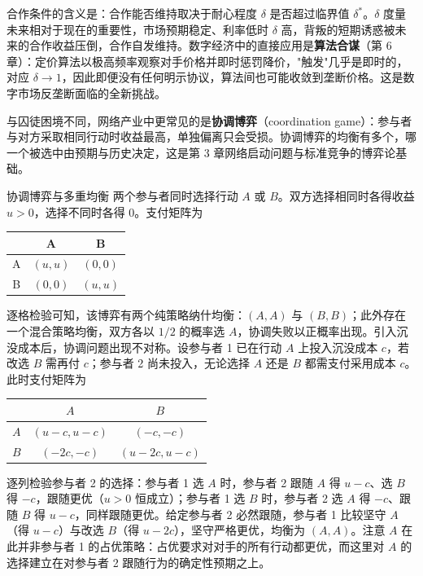 合作条件的含义是：合作能否维持取决于耐心程度 $\delta$ 是否超过临界值 $\delta^*$。$\delta$ 度量未来相对于现在的重要性，市场预期稳定、利率低时 $\delta$ 高，背叛的短期诱惑被未来的合作收益压倒，合作自发维持。数字经济中的直接应用是\textbf{算法合谋}（第 6 章）：定价算法以极高频率观察对手价格并即时惩罚降价，"触发"几乎是即时的，对应 $\delta \to 1$，因此即便没有任何明示协议，算法间也可能收敛到垄断价格。这是数字市场反垄断面临的全新挑战。

与囚徒困境不同，网络产业中更常见的是\textbf{协调博弈}（coordination game）：参与者与对方采取相同行动时收益最高，单独偏离只会受损。协调博弈的均衡有多个，哪一个被选中由预期与历史决定，这是第 3 章网络启动问题与标准竞争的博弈论基础。

\begin{derivation}{协调博弈与多重均衡}{}
两个参与者同时选择行动 $A$ 或 $B$。双方选择相同时各得收益 $u > 0$，选择不同时各得 $0$。支付矩阵为

\begin{center}
\begin{tabular}{c|cc}
 & A & B \\
\hline
A & $(u,u)$ & $(0,0)$ \\
B & $(0,0)$ & $(u,u)$ \\
\end{tabular}
\end{center}

逐格检验可知，该博弈有两个纯策略纳什均衡：$(A,A)$ 与 $(B,B)$；此外存在一个混合策略均衡，双方各以 $1/2$ 的概率选 $A$，协调失败以正概率出现。引入沉没成本后，协调问题出现不对称。设参与者 1 已在行动 $A$ 上投入沉没成本 $c$，若改选 $B$ 需再付 $c$；参与者 2 尚未投入，无论选择 $A$ 还是 $B$ 都需支付采用成本 $c$。此时支付矩阵为

\begin{center}
\begin{tabular}{c|cc}
 & $A$ & $B$ \\
\hline
$A$ & $(u-c, u-c)$ & $(-c, -c)$ \\
$B$ & $(-2c, -c)$ & $(u-2c, u-c)$ \\
\end{tabular}
\end{center}

逐列检验参与者 2 的选择：参与者 1 选 $A$ 时，参与者 2 跟随 $A$ 得 $u-c$、选 $B$ 得 $-c$，跟随更优（$u > 0$ 恒成立）；参与者 1 选 $B$ 时，参与者 2 选 $A$ 得 $-c$、跟随 $B$ 得 $u-c$，同样跟随更优。给定参与者 2 必然跟随，参与者 1 比较坚守 $A$（得 $u-c$）与改选 $B$（得 $u-2c$），坚守严格更优，均衡为 $(A,A)$。注意 $A$ 在此并非参与者 1 的占优策略：占优要求对对手的所有行动都更优，而这里对 $A$ 的选择建立在对参与者 2 跟随行为的确定性预期之上。
\end{derivation}

